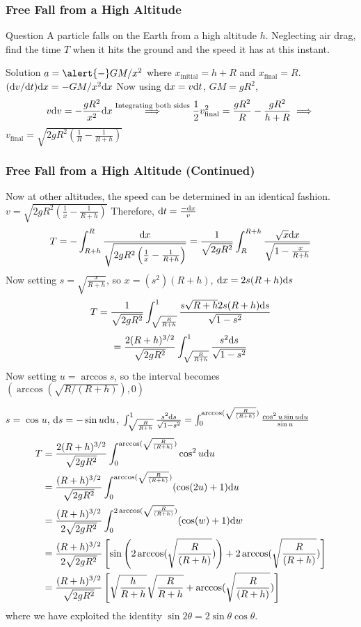 \documentclass{beamer}
\begin{document}
\begin{frame}
\frametitle{Free Fall from a High Altitude}
\begin{block}{Question}
A particle falls on the Earth from a \alert{high altitude} $h$. Neglecting air drag, find the time $T$ when it hits the ground and the speed it has at this instant.
\end{block}
\begin{block}{Solution}
$a=\alert{-}GM/x^2$ where $x_{\text{initial}}=h+R$ and $x_{\text{final}}=R$. $(\mathrm{d} v/\mathrm{d} t)\mathrm{d} x=-GM/x^2 \mathrm{d} x$ Now using $\mathrm{d} x=v\mathrm{d} t$, $GM=gR^2$,
\[v\mathrm{d} v=-\frac{gR^2}{x^2}\mathrm{d} x\overset{\text{Integrating both sides}}{\implies} \frac{1}{2}v_{\text{final}}^2=\frac{gR^2}{R}-\frac{gR^2}{h+R}\implies \]$v_{\text{final}}=\sqrt{2gR^2\left(\frac{1}{R}-\frac{1}{R+h}\right)}$
\end{block}
\end{frame}
\begin{frame}
\frametitle{Free Fall from a High Altitude (Continued)}
Now at other altitudes, the speed can be determined in an identical fashion.
$v=\sqrt{2gR^2\left(\frac{1}{x}-\frac{1}{R+h}\right)}$ Therefore,
$\mathrm{d} t=\frac{-\mathrm{d} x}{v}$
\[
T=-\int_{R+h}^{R}\frac{\mathrm{d} x}{\sqrt{2gR^2\left(\frac{1}{x}-\frac{1}{R+h}\right)}}=\frac{1}{\sqrt{2gR^2}}\int_R^{R+h}\frac{\sqrt{x}\mathrm{d} x}{\sqrt{1-\frac{x}{R+h}}}
\]
Now setting $s=\sqrt{\frac{x}{R+h}}$, so $x=(s^2)(R+h)$, $\mathrm{d} x=2s(R+h)\mathrm{d} s$
\[
T=\frac{1}{\sqrt{2gR^2}}\int_{\sqrt{\frac{R}{R+h}}}^{1}\frac{s\sqrt{R+h}2s(R+h)\mathrm{d} s}{\sqrt{1-s^2}}\]\[=\frac{2(R+h)^{3/2}}{\sqrt{2gR^2}}\int_{\sqrt{\frac{R}{R+h}}}^{1}\frac{s^2\mathrm{d} s}{\sqrt{1-s^2}}
\]
Now setting $u=\arccos s$, so the interval becomes $(\arccos(\sqrt{R/(R+h)}),0)$
\end{frame}
\begin{frame}
$s=\cos u$, $\mathrm{d} s=-\sin u\mathrm{d} u$, $\int_{\sqrt{\frac{R}{R+h}}}^{1}\frac{s^2\mathrm{d} s}{\sqrt{1-s^2}}=\int_{0}^{\arccos(\sqrt{\frac{R}{(R+h)}})}\frac{\cos^2 u\sin u\mathrm{d} u}{\sin u}$
\begin{align*}
T&=\frac{2(R+h)^{3/2}}{\sqrt{2gR^2}}\int_{0}^{\arccos(\sqrt{\frac{R}{(R+h)}})}\cos^2 u\mathrm{d} u\\
&=\frac{(R+h)^{3/2}}{\sqrt{2gR^2}}\int_{0}^{\arccos(\sqrt{\frac{R}{(R+h)}})}(\cos (2u)+1)\mathrm{d} u\\
&=\frac{(R+h)^{3/2}}{2\sqrt{2gR^2}}\int_{0}^{2\arccos(\sqrt{\frac{R}{(R+h)}})}(\cos (w)+1)\mathrm{d} w\\
&=\frac{(R+h)^{3/2}}{2\sqrt{2gR^2}}\left[\sin\left(2\arccos(\sqrt{\frac{R}{(R+h)}})\right)+2\arccos(\sqrt{\frac{R}{(R+h)}})\right]\\
&=\frac{(R+h)^{3/2}}{\sqrt{2gR^2}}\left[\sqrt{\frac{h}{R+h}}\sqrt{\frac{R}{R+h}}+\arccos(\sqrt{\frac{R}{(R+h)}})\right]
\end{align*}
where we have exploited the identity $\sin 2\theta=2\sin\theta\cos\theta$.
\end{frame}
\end{document}
